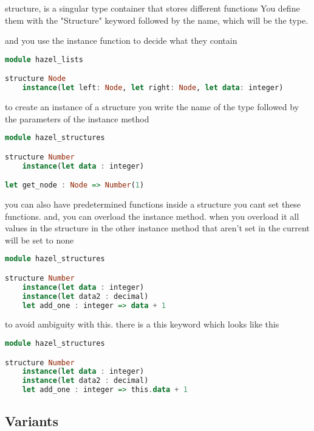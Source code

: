 \documentclass{article}
\begin{document}
structure, is a singular type container that stores different functions
You define them with the "Structure" keyword followed by the name, which will be the type.

and you use the instance function to decide what they contain 

\begin{lstlisting}[language=Haskell, caption=A function that returns a function]
module hazel_lists

structure Node
    instance(let left: Node, let right: Node, let data: integer) 
\end{lstlisting}

to create an instance of a structure you write the name of the type followed by the parameters of the instance method 

\begin{lstlisting}[language=Haskell]
module hazel_structures

structure Number
    instance(let data : integer) 

let get_node : Node => Number(1)
\end{lstlisting}

you can also have predetermined functions inside a structure 
you cant set these functions. and, you can overload the instance method. when you overload it 
all values in the structure in the other instance method that aren't set in the current will be set to none 

\begin{lstlisting}[language=Haskell]
module hazel_structures

structure Number
    instance(let data : integer)
    instance(let data2 : decimal)
    let add_one : integer => data + 1
\end{lstlisting}

to avoid ambiguity with this. there is a this keyword which looks like this


\begin{lstlisting}[language=Haskell]
module hazel_structures

structure Number
    instance(let data : integer)
    instance(let data2 : decimal)
    let add_one : integer => this.data + 1
\end{lstlisting}



\subsection{Variants}
\end{document}
